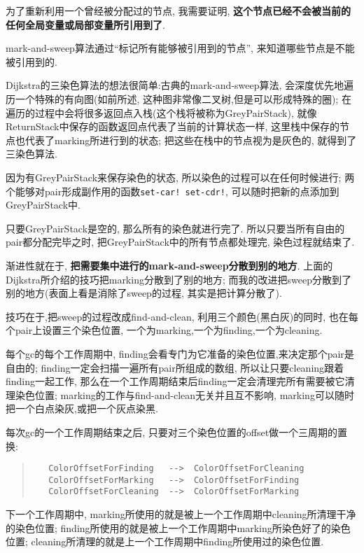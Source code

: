 \documentclass[a4paper]{article}
\begin{document}
为了重新利用一个曾经被分配过的节点,
我需要证明,
\textbf{这个节点已经不会被当前的任何全局变量或局部变量所引用到了}.

mark-and-sweep算法通过``标记所有能够被引用到的节点'',
来知道哪些节点是不能被引用到的.

Dijkstra的三染色算法的想法很简单:古典的mark-and-sweep算法,
会深度优先地遍历一个特殊的有向图(如前所述,
这种图非常像二叉树,但是可以形成特殊的圈);
在遍历的过程中会将很多返回点入栈(这个栈将被称为GreyPairStack),
就像ReturnStack中保存的函数返回点代表了当前的计算状态一样,
这里栈中保存的节点也代表了marking所进行到的状态;
把这些在栈中的节点视为是灰色的,
就得到了三染色算法.

因为有GreyPairStack来保存染色的状态,
所以染色的过程可以在任何时候进行;
两个能够对pair形成副作用的函数\texttt{set-car! set-cdr!},
可以随时把新的点添加到GreyPairStack中.

只要GreyPairStack是空的,
那么所有的染色就进行完了.
所以只要当所有自由的pair都分配完毕之时,
把GreyPairStack中的所有节点都处理完,
染色过程就结束了.

渐进性就在于,
\textbf{把需要集中进行的mark-and-sweep分散到别的地方}.
上面的Dijkstra所介绍的技巧把marking分散到了别的地方;
而我的改进把sweep分散到了别的地方(表面上看是消除了sweep的过程,
其实是把计算分散了).

技巧在于,把sweep的过程改成find-and-clean,
利用三个颜色(黑白灰)的同时,
也在每个pair上设置三个染色位置,
一个为marking,一个为finding,一个为cleaning.

每个gc的每个工作周期中,
finding会看专门为它准备的染色位置,来决定那个pair是自由的;
finding一定会扫描一遍所有pair所组成的数组,
所以让只要cleaning跟着finding一起工作,
那么在一个工作周期结束后finding一定会清理完所有需要被它清理染色位置;
marking的工作与find-and-clean无关并且互不影响,
marking可以随时把一个白点染灰,或把一个灰点染黑.

每次gc的一个工作周期结束之后,
只要对三个染色位置的offset做一个三周期的置换:

\begin{quote}
\begin{verbatim}
   ColorOffsetForFinding   -->  ColorOffsetForCleaning
   ColorOffsetForMarking   -->  ColorOffsetForFinding
   ColorOffsetForCleaning  -->  ColorOffsetForMarking
\end{verbatim}
\end{quote}
下一个工作周期中,
marking所使用的就是被上一个工作周期中cleaning所清理干净的染色位置;
finding所使用的就是被上一个工作周期中marking所染色好了的染色位置;
cleaning所清理的就是上一个工作周期中finding所使用过的染色位置.
\end{document}
